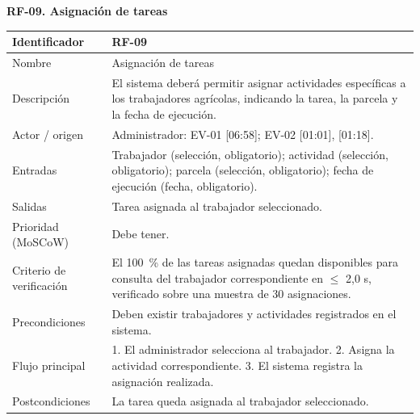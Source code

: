 \documentclass[12pt,a4paper]{article}
\begin{document}
\begin{minipage}{\linewidth}
\bigskip
\noindent\textbf{RF-09. Asignación de tareas}
\label{tab:RF-09}

\begin{center}
\begin{tabular}{|p{3.5cm}|p{10.7cm}|}
\hline
Identificador & RF-09 \\
\hline
Nombre & Asignación de tareas \\
\hline
Descripción & El sistema deberá permitir asignar actividades específicas a los trabajadores agrícolas, indicando la tarea, la parcela y la fecha de ejecución. \\
\hline
Actor / origen & Administrador: EV-01 [06:58]; EV-02 [01:01], [01:18]. \\
\hline
Entradas & Trabajador (selección, obligatorio); actividad (selección, obligatorio); parcela (selección, obligatorio); fecha de ejecución (fecha, obligatorio). \\
\hline
Salidas & Tarea asignada al trabajador seleccionado. \\
\hline
Prioridad (MoSCoW) & Debe tener. \\
\hline
Criterio de verificación & El 100~\% de las tareas asignadas quedan disponibles para consulta del trabajador correspondiente en $\leq$ 2,0 s, verificado sobre una muestra de 30 asignaciones. \\
\hline
Precondiciones & Deben existir trabajadores y actividades registrados en el sistema. \\
\hline
Flujo principal & 1. El administrador selecciona al trabajador. 2. Asigna la actividad correspondiente. 3. El sistema registra la asignación realizada. \\
\hline
Postcondiciones & La tarea queda asignada al trabajador seleccionado. \\
\hline
\end{tabular}
\end{center}
\end{minipage}
\end{document}
